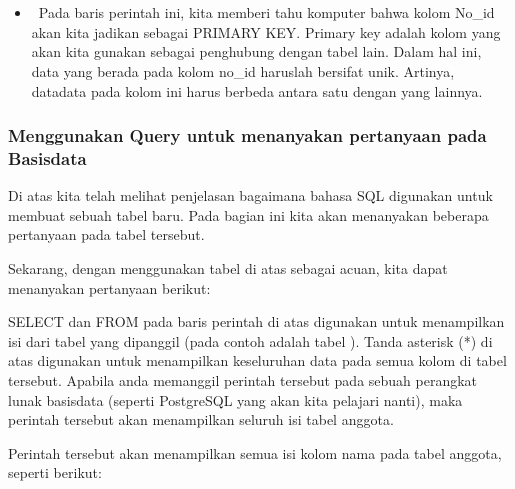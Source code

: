 \documentclass[letterpaper,10pt,english]{sphinxmanual}
\begin{document}
 

\begin{sphinxVerbatim}[commandchars=\\\{\}]
  
\end{sphinxVerbatim}

 
\begin{itemize}
\item {} 
  Pada baris perintah ini, kita memberi tahu komputer bahwa kolom No\_id akan kita jadikan sebagai PRIMARY KEY. Primary key adalah kolom yang akan kita gunakan sebagai penghubung dengan tabel lain. Dalam hal ini, data yang berada pada kolom no\_id haruslah bersifat unik. Artinya, data\sphinxhyphen{}data pada kolom ini harus berbeda antara satu dengan yang lainnya.

\end{itemize}


\subsubsection{Menggunakan Query untuk menanyakan pertanyaan pada Basisdata}
\label{\detokenize{sesi2/relationaldb:menggunakan-query-untuk-menanyakan-pertanyaan-pada-basisdata}}
Di atas kita telah melihat penjelasan bagaimana bahasa SQL digunakan untuk membuat sebuah tabel baru. Pada bagian ini kita akan menanyakan beberapa pertanyaan pada tabel tersebut.

Sekarang, dengan menggunakan tabel  di atas sebagai acuan, kita dapat menanyakan pertanyaan berikut:

\begin{sphinxVerbatim}[commandchars=\\\{\}]
   
\end{sphinxVerbatim}

SELECT dan FROM pada baris perintah di atas digunakan untuk menampilkan isi dari tabel yang dipanggil (pada contoh adalah tabel ). Tanda asterisk (*) di atas digunakan untuk menampilkan keseluruhan data pada semua kolom di tabel tersebut. Apabila anda memanggil perintah tersebut pada sebuah perangkat lunak basisdata (seperti PostgreSQL yang akan kita pelajari nanti), maka perintah tersebut akan menampilkan seluruh isi tabel anggota.

Perintah tersebut akan menampilkan semua isi kolom nama pada tabel anggota, seperti berikut:
\end{document}
